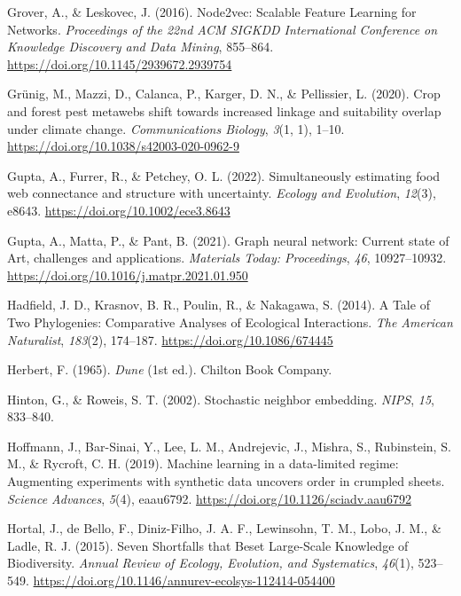 \documentclass[11pt]{article}
\newlength{\cslhangindent}
\newenvironment{CSLReferences}[2] %
 {%
  \setlength{\parindent}{0pt}
  \ifodd #1 \everypar{\setlength{\hangindent}{\cslhangindent}}\ignorespaces\fi
  \ifnum #2 > 0
  \setlength{\parskip}{#2\baselineskip}
  \fi
 }%
 {}
\begin{document}
\begin{CSLReferences}{1}{0}
\leavevmode{}%
Grover, A., \& Leskovec, J. (2016). Node2vec: Scalable Feature Learning
for Networks. \emph{Proceedings of the 22nd ACM SIGKDD International
Conference on Knowledge Discovery and Data Mining}, 855--864.
\url{https://doi.org/10.1145/2939672.2939754}

\leavevmode{}%
Grünig, M., Mazzi, D., Calanca, P., Karger, D. N., \& Pellissier, L.
(2020). Crop and forest pest metawebs shift towards increased linkage
and suitability overlap under climate change. \emph{Communications
Biology}, \emph{3}(1, 1), 1--10.
\url{https://doi.org/10.1038/s42003-020-0962-9}

\leavevmode{}%
Gupta, A., Furrer, R., \& Petchey, O. L. (2022). Simultaneously
estimating food web connectance and structure with uncertainty.
\emph{Ecology and Evolution}, \emph{12}(3), e8643.
\url{https://doi.org/10.1002/ece3.8643}

\leavevmode{}%
Gupta, A., Matta, P., \& Pant, B. (2021). Graph neural network: Current
state of Art, challenges and applications. \emph{Materials Today:
Proceedings}, \emph{46}, 10927--10932.
\url{https://doi.org/10.1016/j.matpr.2021.01.950}

\leavevmode{}%
Hadfield, J. D., Krasnov, B. R., Poulin, R., \& Nakagawa, S. (2014). A
Tale of Two Phylogenies: Comparative Analyses of Ecological
Interactions. \emph{The American Naturalist}, \emph{183}(2), 174--187.
\url{https://doi.org/10.1086/674445}

\leavevmode{}%
Herbert, F. (1965). \emph{Dune} (1st ed.). Chilton Book Company.

\leavevmode{}%
Hinton, G., \& Roweis, S. T. (2002). Stochastic neighbor embedding.
\emph{NIPS}, \emph{15}, 833--840.

\leavevmode{}%
Hoffmann, J., Bar-Sinai, Y., Lee, L. M., Andrejevic, J., Mishra, S.,
Rubinstein, S. M., \& Rycroft, C. H. (2019). Machine learning in a
data-limited regime: Augmenting experiments with synthetic data uncovers
order in crumpled sheets. \emph{Science Advances}, \emph{5}(4),
eaau6792. \url{https://doi.org/10.1126/sciadv.aau6792}

\leavevmode{}%
Hortal, J., de Bello, F., Diniz-Filho, J. A. F., Lewinsohn, T. M., Lobo,
J. M., \& Ladle, R. J. (2015). Seven Shortfalls that Beset Large-Scale
Knowledge of Biodiversity. \emph{Annual Review of Ecology, Evolution,
and Systematics}, \emph{46}(1), 523--549.
\url{https://doi.org/10.1146/annurev-ecolsys-112414-054400}


\end{CSLReferences}
\end{document}
